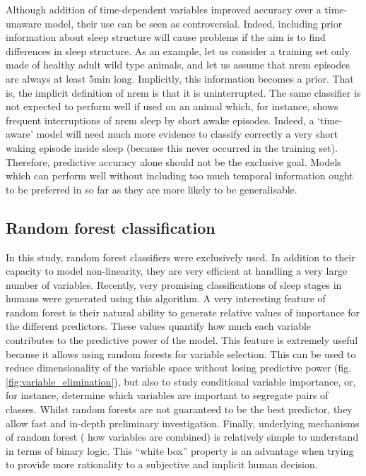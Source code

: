 Although addition of time-dependent variables improved accuracy over a time-unaware model, their use can be seen as controversial.
Indeed, including prior information about sleep structure will cause problems if the aim is to find differences in sleep structure.
As an example, let us consider a training set only made of healthy adult wild type animals,
and let us assume that \gls{nrem} episodes are always at least 5min long.
Implicitly, this information becomes a prior. That is, the implicit definition of \gls{nrem} is that it
is uninterrupted.
The same classifier is not expected to perform well if used on an animal which, for instance, shows frequent interruptions of \gls{nrem} sleep by short awake episodes.
Indeed, a `time-aware' model will need much more evidence to classify correctly a very short waking episode inside sleep (because this never occurred in the training set).
Therefore, predictive accuracy alone should not be the exclusive goal.
Models which can perform well without including too much temporal information ought to be preferred in so far as
they are more likely to be generalisable.



\subsection{Random forest classification}

In this study, random forest classifiers\cite{breiman_random_2001} were exclusively used.
In addition to their capacity to model non-linearity, they are very efficient at handling a very large number of variables.
Recently, very promising classifications of sleep stages in humans were generated
using this algorithm\cite{sen_comparative_2014}.
A very interesting feature of random forest is their
natural ability to generate relative values of importance for the different predictors.
These values quantify how much each variable contributes to the predictive power of the model.
This feature is extremely useful because it allows using random forests for variable selection.
This can be used to reduce dimensionality of the variable space without losing predictive power (fig.\ref{fig:variable_elimination}),
but also to study conditional variable importance\cite{strobl_conditional_2008}, or, for instance,
determine which variables are important to segregate pairs of classes.
Whilst random forests are not guaranteed to be the best predictor, they allow fast and in-depth preliminary investigation.
Finally, underlying mechanisms of random forest (\ie{} how  variables are combined) is relatively simple to understand in terms of binary logic.
This ``white box'' property is an advantage when trying to provide more rationality to a subjective and implicit human decision.



